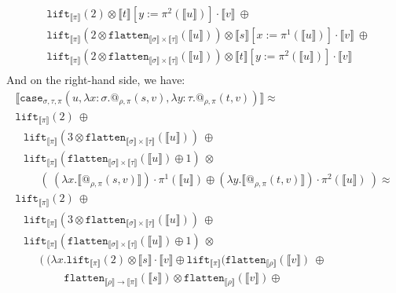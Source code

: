 \documentclass[runningheads,a4paper]{llncs}
\newcommand{\typeinterpret}[1]{\llbracket #1 \rrbracket}
\newcommand{\interpret}[1]{\llbracket #1 \rrbracket}
\newcommand{\arrtype}{\rightarrow}
\newcommand{\abs}[2]{\lambda #1.#2}
\newcommand{\flatten}{\mathtt{flatten}}
\newcommand{\lift}{\mathtt{lift}}
\begin{document}
\begin{itemize}
\[\begin{array}{l}
  \phantom{A}
  \lift_{\typeinterpret{\pi}}(2) \otimes
     \interpret{t}[y:=\pi^2(\interpret{u})] \cdot \interpret{v}\ 
     \oplus \\
  \phantom{A}
  \lift_{\typeinterpret{\pi}}(2 \otimes
    \flatten_{\typeinterpret{\sigma} \times \typeinterpret{\tau}}(
    \interpret{u})) \otimes
    \interpret{s}[x:=\pi^1(\interpret{u})] \cdot \interpret{v}\ \oplus \\
  \phantom{A}
  \lift_{\typeinterpret{\pi}}(2 \otimes
    \flatten_{\typeinterpret{\sigma} \times \typeinterpret{\tau}}(
    \interpret{u})) \otimes
     \interpret{t}[y:=\pi^2(\interpret{u})] \cdot \interpret{v} \\
  \end{array}
  \]
  And on the right-hand side, we have:
  \[
  \begin{array}{l}
  \interpret{\mathtt{case}_{\sigma,\tau,\pi}(u,\abs{x:\sigma}{
  @_{\rho,\pi}(s,v)},\abs{y:\tau}{@_{\rho,\pi}(t,v)})} \approx \\
  \lift_{\typeinterpret{\pi}}(2)\ \oplus \\
  \phantom{A}
  \lift_{\typeinterpret{\pi}}(3 \otimes \flatten_{\typeinterpret{\sigma}
    \times \typeinterpret{\tau}}(\interpret{u}))\ \oplus \\
  \phantom{A}
  \lift_{\typeinterpret{\pi}}(\flatten_{\typeinterpret{\sigma} \times
    \typeinterpret{\tau}}(\interpret{u}) \oplus 1)\ \otimes \\
  \phantom{ABC}
  (\ (\abs{x}{\interpret{@_{\rho,\pi}(s,v)}}) \cdot \pi^1(
      \interpret{u}) \oplus
     (\abs{y}{\interpret{@_{\rho,\pi}(t,v)}}) \cdot \pi^2(
      \interpret{u})\ ) \approx \\
  \lift_{\typeinterpret{\pi}}(2)\ \oplus \\
  \phantom{A}
  \lift_{\typeinterpret{\pi}}(3 \otimes \flatten_{\typeinterpret{\sigma}
    \times \typeinterpret{\tau}}(\interpret{u}))\ \oplus \\
  \phantom{A}
  \lift_{\typeinterpret{\pi}}(\flatten_{\typeinterpret{\sigma} \times
    \typeinterpret{\tau}}(\interpret{u}) \oplus 1)\ \otimes \\
  \phantom{ABC}
  (\ (\abs{x}{\lift_{\typeinterpret{\pi}}(2) \otimes
    \interpret{s} \cdot \interpret{v} \oplus
    \lift_{\typeinterpret{\pi}}(\flatten_{
    \typeinterpret{\rho}}(\interpret{v})\ \oplus \\
  \phantom{ABCDEF}\flatten_{\typeinterpret{\rho} \arrtype
    \typeinterpret{\pi}}(\interpret{s}) \otimes
    \flatten_{\typeinterpret{\rho}}(\interpret{v}) \oplus
}
\end{array}\]
\end{itemize}
\end{document}

